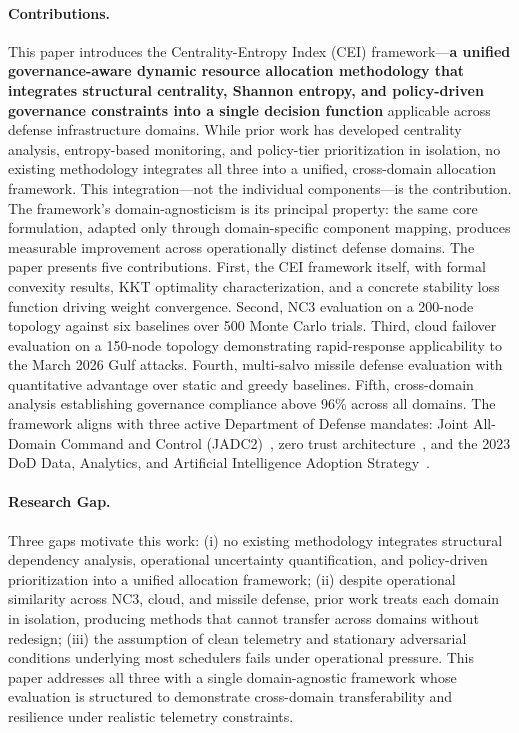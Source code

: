 \documentclass[runningheads]{llncs}
\begin{document}
\paragraph{Contributions.}
This paper introduces the Centrality-Entropy Index (CEI) framework---\textbf{a unified governance-aware dynamic resource allocation methodology that integrates structural centrality, Shannon entropy, and policy-driven governance constraints into a single decision function} applicable across defense infrastructure domains. While prior work has developed centrality analysis, entropy-based monitoring, and policy-tier prioritization in isolation, no existing methodology integrates all three into a unified, cross-domain allocation framework. This integration---not the individual components---is the contribution. The framework's domain-agnosticism is its principal property: the same core formulation, adapted only through domain-specific component mapping, produces measurable improvement across operationally distinct defense domains. The paper presents five contributions. First, the CEI framework itself, with formal convexity results, KKT optimality characterization, and a concrete stability loss function driving weight convergence. Second, NC3 evaluation on a 200-node topology against six baselines over 500 Monte Carlo trials. Third, cloud failover evaluation on a 150-node topology demonstrating rapid-response applicability to the March 2026 Gulf attacks. Fourth, multi-salvo missile defense evaluation with quantitative advantage over static and greedy baselines. Fifth, cross-domain analysis establishing governance compliance above 96\% across all domains. The framework aligns with three active Department of Defense mandates: Joint All-Domain Command and Control (JADC2)~\cite{jadc2}, zero trust architecture~\cite{gao_it}, and the 2023 DoD Data, Analytics, and Artificial Intelligence Adoption Strategy~\cite{dod_ai}.

\paragraph{Research Gap.}
Three gaps motivate this work: (i) no existing methodology integrates structural dependency analysis, operational uncertainty quantification, and policy-driven prioritization into a unified allocation framework; (ii) despite operational similarity across NC3, cloud, and missile defense, prior work treats each domain in isolation, producing methods that cannot transfer across domains without redesign; (iii) the assumption of clean telemetry and stationary adversarial conditions underlying most schedulers fails under operational pressure. This paper addresses all three with a single domain-agnostic framework whose evaluation is structured to demonstrate cross-domain transferability and resilience under realistic telemetry constraints.
\end{document}
